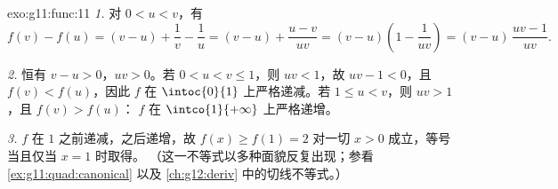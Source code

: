 \begin{solution}{exo:g11:func:11}
\emph{1.} 对 $0 < u < v$，有
\[
f(v) - f(u) = (v - u) + \frac1v - \frac1u
= (v - u) + \frac{u - v}{uv}
= (v - u)\left(1 - \frac{1}{uv}\right)
= (v - u)\,\frac{uv - 1}{uv}.
\]

\emph{2.} 恒有 $v - u > 0$，$uv > 0$。若 $0 < u < v \leq 1$，则
$uv < 1$，故 $uv - 1 < 0$，且 $f(v) < f(u)$，因此 $f$ 在
$\intoc{0}{1}$ 上严格递减。若 $1 \leq u < v$，则 $uv > 1$，且 $f(v) > f(u)$：
$f$ 在 $\intco{1}{+\infty}$ 上严格递增。

\emph{3.} $f$ 在 $1$ 之前递减，之后递增，故
$f(x) \geq f(1) = 2$ 对一切 $x > 0$ 成立，等号当且仅当 $x = 1$ 时取得。
（这一不等式以多种面貌反复出现；参看
\cref{ex:g11:quad:canonical} 以及
\cref{ch:g12:deriv} 中的切线不等式。）
\end{solution}

